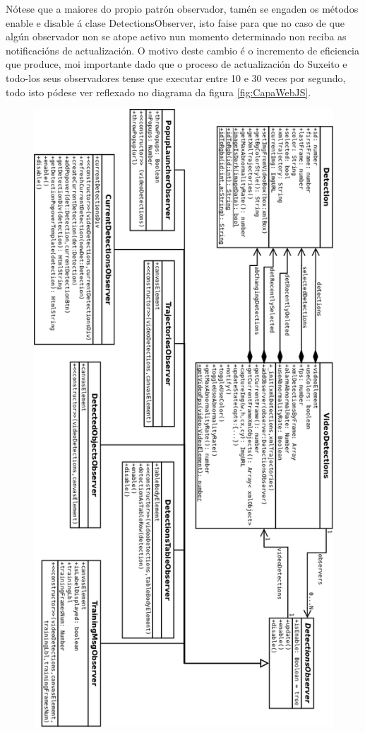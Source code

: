     Nótese que a maiores do propio patrón observador, tamén se engaden os métodos enable e disable á
    clase DetectionsObserver, isto faise para que no caso de que algún observador non se atope 
    activo nun momento determinado non reciba as notificacións de actualización. O motivo deste
    cambio é o incremento de eficiencia que produce, moi importante dado que o proceso de actualización
    do Suxeito e todo-los seus observadores tense que executar entre 10 e 30 veces por segundo, todo
    isto pódese ver reflexado no diagrama da figura \ref{fig:CapaWebJS}.
    
    \begin{figure}[htp]
    \begin{center}
        \includegraphics[scale=0.45]{figures/CapaWebJS.png}

\end{center}
\end{figure}
